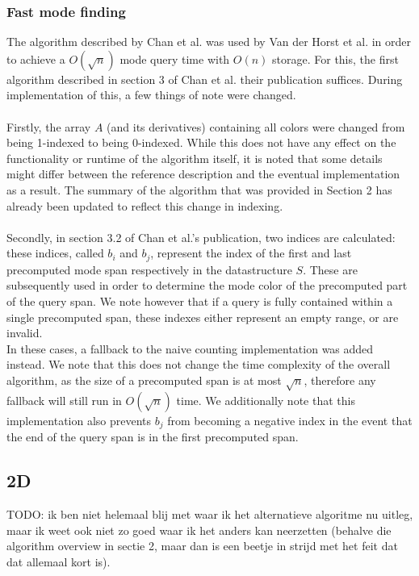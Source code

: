 \documentclass{article}
\begin{document}
\subsubsection{Fast mode finding}
The algorithm described by Chan et al. \cite{Chan2014} was used by Van der
Horst et al. in order to achieve a $O(\sqrt{n})$ mode query time with $O(n)$
storage. For this, the first algorithm described in section 3 of Chan et al.
their publication suffices. During implementation of this, a few things of note
were changed.\\\\ Firstly, the array $A$ (and its derivatives) containing all
colors were changed from being 1-indexed to being 0-indexed. While this does
not have any effect on the functionality or runtime of the algorithm itself, it
is noted that some details might differ between the reference description and
the eventual implementation as a result. The summary of the algorithm that was
provided in Section 2 has already been updated to reflect this change in
indexing.\\\\ Secondly, in section 3.2 of Chan et al.'s publication, two
indices are calculated: these indices, called $b_i$ and $b_j$, represent the
index of the first and last precomputed mode span respectively in the
datastructure $S$. These are subsequently used in order to determine the mode
color of the precomputed part of the query span. We note however that if a
query is fully contained within a single precomputed span, these indexes either
represent an empty range, or are invalid. \\ In these cases, a fallback to the
naive counting implementation was added instead. We note that this does not
change the time complexity of the overall algorithm, as the size of a
precomputed span is at most $\sqrt{n}$, therefore any fallback will still run
in $O(\sqrt{n})$ time. We additionally note that this implementation also
prevents $b_j$ from becoming a negative index in the event that the end of the
query span is in the first precomputed span.
\subsection{2D}
TODO: ik ben niet helemaal blij met waar ik het alternatieve algoritme nu
uitleg, maar ik weet ook niet zo goed waar ik het anders kan neerzetten
(behalve die algorithm overview in sectie 2, maar dan is een beetje in strijd
met het feit dat dat allemaal kort is).
\end{document}
